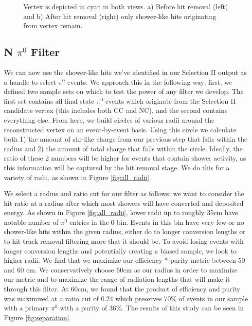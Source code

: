 \documentclass[12pt]{article}
\begin{document}
\begin{figure}[h!]
\centering
{}
\hspace{1 mm}
\caption{Vertex is depicted in cyan in both views. a) Before hit removal (left) and b) After hit removal (right) only shower-like hits originating from vertex remain. }
\label{fig:hitremoval}
\end{figure}

\subsection{N $\pi^0$ Filter}
We can now use the shower-like hits we've identified in our Selection II output as a handle to select $\pi^0$ events.  We approach this in the following way: first, we defined two sample sets on which to test the power of any filter we develop. The first set contains all final state $\pi^0$ events which originate from the Selection II candidate vertex (this includes both CC and NC), and the second contains everything else.  From here, we build circles of various radii around the reconstructed vertex on an event-by-event basis. Using this circle we calculate both 1) the amount of shr-like charge from our previous step that falls within the radius and 2) the amount of total charge that falls within the circle.  Ideally, the ratio of these 2 numbers will be higher for events that contain shower activity, as this information will be captured by the hit removal stage.  We do this for a variety of radii, as shown in Figure \ref{fig:all_radii}.  
\par We select a radius and ratio cut for our filter as follows:  we want to consider the hit ratio at a radius after which most showers will have converted and deposited energy.  As shown in Figure \ref{fig:all_radii}, lower radii up to roughly 35cm have notable number of $\pi^0$ entries in the 0 bin. Events in this bin have very few or no shower-like hits within the given radius, either do to longer conversion lengths or to hit track removal filtering more that it should be. To avoid losing events with longer conversion lengths and potentially creating a biased sample, we look to higher radii. We find that we maximize our efficiency * purity metric between 50 and 60 cm. We conservatively choose 60cm as our radius in order to maximize our metric and to maximize the range of radiation lengths that will make it through this filter.  At 60cm, we found that the product of efficiency and purity was maximized at a ratio cut of 0.24 which preserves 70\% of events in our sample with a primary $\pi^0$ with a purity of 36\%. The results of this study can be seen in Figure \ref{fig:separation}.
\end{document}
